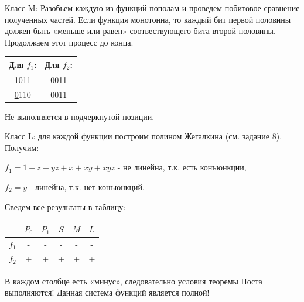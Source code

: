 \documentclass[12pt]{article}
\begin{document}
Класс M: Разобьем каждую из функций пополам и проведем побитовое
сравнение полученных частей. Если функция монотонна, то каждый бит первой
половины должен быть «меньше или равен» соотвествующего бита второй
половины. Продолжаем этот процесс до конца.

\begin{center}
        \begin{tabular}{ |c|c| }
                \hline
                Для $f_1$: & Для $f_2$: \\
                \hline
                \underline{1}011 & 0011 \\
                \underline{0}110 & 0011 \\
				\hline
        \end{tabular}
\end{center}

Не выполняется в подчеркнутой позиции.

Класс L: для каждой функции построим полином Жегалкина (см.
задание 8). Получим:

$f_1=1 + z + yz + x + xy + xyz$ - не линейна, т.к. есть конъюнкции,

$f_2 = y$ - линейна, т.к. нет конъюнкций.

Сведем все результаты в таблицу:

\begin{center}
        \begin{tabular}{ |c|c|c|c|c|c| }
                \hline
                 & $P_0$ & $P_1$ & $S$ & $M$ & $L$\\
                \hline
                $f_1$ & - & - & - & - & -\\
				\hline
                $f_2$ & + & + & + & + & +\\
				\hline
        \end{tabular}
\end{center}

В каждом столбце есть «минус», следовательно условия теоремы Поста
выполняются! Данная система функций является полной!
\end{document}
